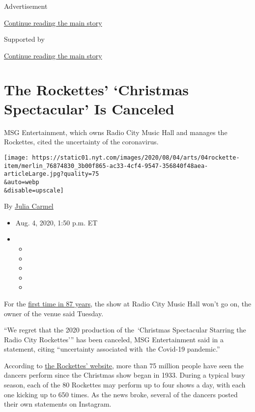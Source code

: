 Advertisement

\protect\hyperlink{after-top}{Continue reading the main story}

Supported by

\protect\hyperlink{after-sponsor}{Continue reading the main story}

\hypertarget{the-rockettes-christmas-spectacular-is-canceled}{%
\section{The Rockettes' `Christmas Spectacular' Is
Canceled}\label{the-rockettes-christmas-spectacular-is-canceled}}

MSG Entertainment, which owns Radio City Music Hall and manages the
Rockettes, cited the uncertainty of the coronavirus.

\texttt{[image: https://static01.nyt.com/images/2020/08/04/arts/04rockette-item/merlin\_76874830\_3b00f865-ac33-4cf4-9547-356840f48aea-articleLarge.jpg?quality=75\\\&auto=webp\\\&disable=upscale]}

By \href{https://www.nytimes.com/by/julia-carmel}{Julia Carmel}

\begin{itemize}
\item
  Aug. 4, 2020, 1:50 p.m. ET
\item
  \begin{itemize}
  \item
  \item
  \item
  \item
  \item
  \end{itemize}
\end{itemize}

For the
\href{https://www.rockettes.com/blog/fun-facts-about-the-radio-city-christmas-spectacular-and-the-rockettes/}{first
time in 87 years}, the show at Radio City Music Hall won't go on, the
owner of the venue said Tuesday.

``We regret that the 2020 production of the~`Christmas Spectacular
Starring the Radio City Rockettes''' has been canceled, MSG
Entertainment said in a statement, citing ``uncertainty associated
with~the Covid-19 pandemic.''

According to \href{https://www.rockettes.com/blog/}{the Rockettes'
website}, more than 75 million people have seen the dancers perform
since the Christmas show began in 1933. During a typical busy season,
each of the 80 Rockettes may perform up to four shows a day, with each
one kicking up to 650 times. As the news broke, several of the dancers
posted their own statements on Instagram.

